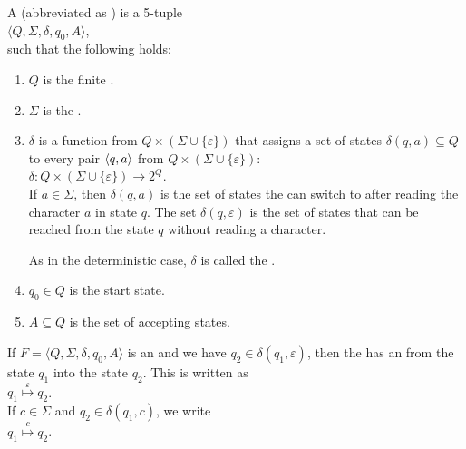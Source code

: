 \begin{Definition}[NFA]
A  
(abbreviated as ) 
is a  5-tuple
\\[0.2cm]
\hspace*{1.3cm}
$\langle Q, \Sigma, \delta, q_0, A\rangle$,
\\[0.2cm]
such that the following holds:
\begin{enumerate}
\item $Q$ is the finite .
\item $\Sigma$ is the .
\item $\delta$ is a function from $Q \times (\Sigma \cup \{ \varepsilon \})$ that assigns a set of states
      $\delta(q, a) \subseteq Q$ to every pair $\pair(q, a)$ from $Q \times (\Sigma \cup \{ \varepsilon \})$:
      \\[0.2cm]
      \hspace*{1.3cm}
      $\delta: Q \times (\Sigma \cup \{\varepsilon\}) \rightarrow 2^Q$.
      \\[0.2cm]
      If $a \in \Sigma$, then $\delta(q, a)$ is the set of states the  can switch to
      after reading the character $a$ in state $q$.  The set $\delta(q, \varepsilon)$ is the
      set of states that can be reached from the state $q$ without reading a character.
      
      As in the deterministic case, $\delta$ is called the .
\item $q_0 \in Q$ is the start state.
\item $A \subseteq Q$ is the set of accepting states. \eox
\end{enumerate}

If $F = \langle Q, \Sigma, \delta, q_0, A\rangle$ is an  and we have $q_2 \in \delta(q_1,
\varepsilon)$, then the  has an 
 from the state $q_1$ into the state $q_2$.  This is written as
\\[0.2cm]
\hspace*{1.3cm}
$q_1 \stackrel{\varepsilon}{\mapsto} q_2$.
\\[0.2cm]
If  $c \in \Sigma$ and  $q_2 \in \delta(q_1, c)$, we write
\\[0.2cm]
\hspace*{1.3cm}
$q_1 \stackrel{c}{\mapsto} q_2$. 
\end{Definition}

